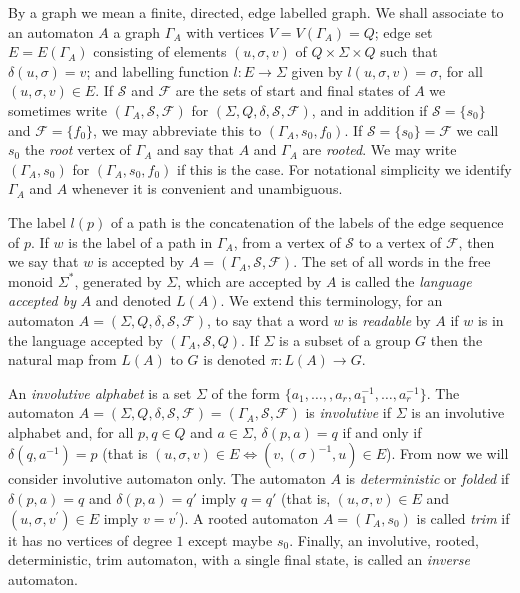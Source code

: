 \documentclass[a4paper,12pt]{article}
\newcommand{\G}{\Gamma }
\renewcommand{\d}{\delta }
\newcommand{\s}{\sigma }
\renewcommand{\S}{\Sigma }
\newcommand{\cF}{{\cal{F}}}
\newcommand{\cS}{{\cal{S}}}
\numberwithin{equation}{section}
\numberwithin{figure}{section}
\renewcommand{\cF}{\mathcal{F}}
\renewcommand{\cS}{\mathcal{S}}
\newcommand{\maps}{\rightarrow}
\begin{document}
 
By a graph we mean a finite, directed, edge labelled graph. 
We shall associate to an automaton $A$
a graph $\G_A$ with vertices
$V=V(\G_A)=Q$; edge set $E=E(\G_A)$ consisting of elements
$(u,\s,v)$ of $Q\times \S\times Q$ such that $\d(u,\s)=v$; and
labelling function $l:E\maps \S$ given by $l(u,\s,v)=\s$, for all
$(u,\s,v) \in E$.  If $\mathcal{S}$ and $\mathcal{F}$ are the sets
of start and final states of $A$ we sometimes write
$(\G_A,\mathcal{S},\mathcal{F})$ for
$(\S,Q,\d,\mathcal{S},\mathcal{F})$, and in addition if
$\mathcal{S}=\{s_0\}$ and $\mathcal{F}=\{f_0\}$, we may abbreviate 
this to $(\G_A,s_0,f_0)$. If $\mathcal{S}=\{s_0\}=\mathcal{F}$ 
we 
call $s_0$ the {\em root}
vertex of $\G_A$ and say that $A$ and $\G_A$ are {\em rooted}. We may
 write $(\G_A,s_0)$ for $(\G_A,s_0,f_0)$ if this is the case.  For notational simplicity we identify $\G_A$
and $A$ whenever it is convenient and unambiguous. 


The
label $l(p)$ of a path is the concatenation of the labels of the
edge sequence of $p$.  If $w$ is the label of a path 
in $\G_A$, from a vertex of $\cS$ to a vertex of $\cF$, then we
say that $w$ is accepted by $A=(\G_A,\cS,\cF)$. The set of all
words in the free monoid $\S^*$, generated by $\S$, which are 
accepted by $A$  is called
the {\em language accepted by} $A$ and denoted $L(A)$. 
We extend this terminology, for an automaton 
$A=(\S,Q,\d,\mathcal{S},\mathcal{F})$,  
to say that a  word $w$ is {\em readable} 
by $A$ if $w$ is in the
language accepted by $(\G_A,\cS,Q)$.  
If $\S$ is a
subset of a group $G$
 then the  natural map from $L(A)$ to
$G$ is denoted $\pi:L(A)\maps G$.



An {\em involutive alphabet} is a set $\S$ of the form $\{a_1, \ldots, ,
a_r, a_1^{-1}, \ldots, a_r^{-1}\}$.
The automaton $A =(\S, Q, \d,\mathcal{S},\mathcal{F})
= (\G_A, \mathcal{S}, \mathcal{F})$ is {\em
involutive} if $\S$ is an
involutive alphabet and, for all $p, q \in Q$ and $a \in \S$,
$\d(p,a)=q$ if and only if $\d(q, a^{-1})=p$ (that is $(u, \s, v) \in E
\Leftrightarrow (v, (\s)^{-1}, u) \in E$). From now we will
consider involutive automaton only. The automaton $A$ 
is {\em deterministic}  or {\em folded} if $\d(p,a)=q$ and
$\d(p,a)=q'$ imply $q=q'$ (that is, $(u, \s, v)
\in E$ and $(u, \s, v^\prime) \in E$ imply $v=v^\prime$). A rooted
automaton $A= (\G_A, s_0)$ is called {\em trim} if it has no
vertices of degree $1$ except maybe $s_0$. Finally, an involutive, rooted, 
deterministic, trim automaton, with a single final state, is called 
an {\em inverse} automaton. 
\end{document}
